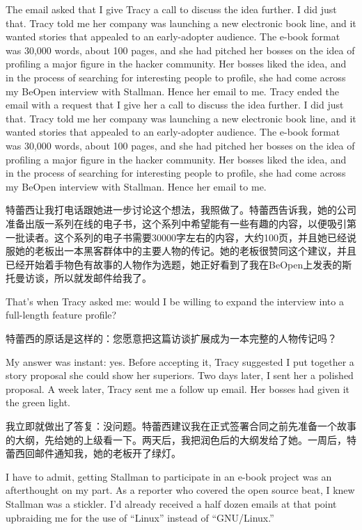 \ifdefined\eng
\ifdefined\vone
The email asked that I give Tracy a call to discuss the idea further. I did just that. Tracy told me her company was launching a new electronic book line, and it wanted stories that appealed to an early-adopter audience. The e-book format was 30,000 words, about 100 pages, and she had pitched her bosses on the idea of profiling a major figure in the hacker community. Her bosses liked the idea, and in the process of searching for interesting people to profile, she had come across my BeOpen interview with Stallman. Hence her email to me.
\fi
\ifdefined\vtwo
Tracy ended the email with a request that I give her a call to discuss the idea further. I did just that. Tracy told me her company was launching a new electronic book line, and it wanted stories that appealed to an early-adopter audience. The e-book format was 30,000 words, about 100 pages, and she had pitched her bosses on the idea of profiling a major figure in the hacker community. Her bosses liked the idea, and in the process of searching for interesting people to profile, she had come across my BeOpen interview with Stallman. Hence her email to me.
\fi
\fi

\ifdefined\chs
特蕾西让我打电话跟她进一步讨论这个想法，我照做了。特蕾西告诉我，她的公司准备出版一系列在线的电子书，这个系列中希望能有一些有趣的内容，以便吸引第一批读者。这个系列的电子书需要30000字左右的内容，大约100页，并且她已经说服她的老板出一本黑客群体中的主要人物的传记。她的老板很赞同这个建议，并且已经开始着手物色有故事的人物作为选题，她正好看到了我在BeOpen上发表的斯托曼访谈，所以就发邮件给我了。
\fi

\ifdefined\eng
That's when Tracy asked me: would I be willing to expand the interview into a full-length feature profile?
\fi

\ifdefined\chs
特蕾西的原话是这样的：您愿意把这篇访谈扩展成为一本完整的人物传记吗？
\fi

\ifdefined\eng
My answer was instant: yes. Before accepting it, Tracy suggested I put together a story proposal she could show her superiors. Two days later, I sent her a polished proposal. A week later, Tracy sent me a follow up email. Her bosses had given it the green light.
\fi

\ifdefined\chs
我立即就做出了答复：没问题。特蕾西建议我在正式签署合同之前先准备一个故事的大纲，先给她的上级看一下。两天后，我把润色后的大纲发给了她。一周后，特蕾西回邮件通知我，她的老板开了绿灯。
\fi

\ifdefined\eng
I have to admit, getting Stallman to participate in an e-book project was an afterthought on my part. As a reporter who covered the open source beat, I knew Stallman was a stickler. I'd already received a half dozen emails at that point upbraiding me for the use of ``Linux'' instead of ``GNU/Linux.''
\fi

